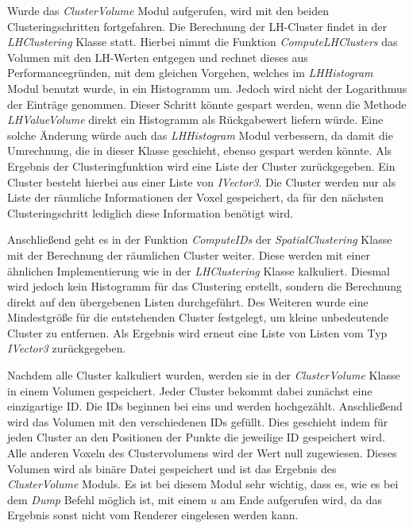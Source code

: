 Wurde das \textit{ClusterVolume} Modul aufgerufen, wird mit den beiden Clusteringschritten fortgefahren. Die Berechnung der LH-Cluster findet in der \textit{LHClustering} Klasse statt. Hierbei nimmt die Funktion \textit{ComputeLHClusters} das Volumen mit den LH-Werten entgegen und rechnet dieses aus Performancegründen, mit dem gleichen Vorgehen, welches im \textit{LHHistogram} Modul benutzt wurde, in ein Histogramm um. Jedoch wird nicht der Logarithmus der Einträge genommen. Dieser Schritt könnte gespart werden, wenn die Methode \textit{LHValueVolume} direkt ein Histogramm als Rückgabewert liefern würde. Eine solche Änderung würde auch das \textit{LHHistogram} Modul verbessern, da damit die Umrechnung, die in dieser Klasse geschieht, ebenso gespart werden könnte.
\newline
Als Ergebnis der Clusteringfunktion wird eine Liste der Cluster zurückgegeben. Ein Cluster besteht hierbei aus einer Liste von \textit{IVector3}. Die Cluster werden nur als Liste der räumliche Informationen der Voxel gespeichert, da für den nächsten Clusteringschritt  lediglich diese Information benötigt wird. 


Anschließend geht es in der Funktion \textit{ComputeIDs} der \textit{SpatialClustering} Klasse mit der Berechnung der räumlichen Cluster weiter. Diese werden mit einer ähnlichen Implementierung wie in der \textit{LHClustering} Klasse kalkuliert. Diesmal wird jedoch kein Histogramm für das Clustering erstellt, sondern die Berechnung direkt auf den übergebenen Listen durchgeführt. Des Weiteren wurde eine Mindestgröße für die entstehenden Cluster festgelegt, um kleine unbedeutende Cluster zu entfernen. Als Ergebnis wird erneut eine Liste von Listen vom Typ \textit{IVector3} zurückgegeben.


Nachdem alle Cluster kalkuliert wurden, werden sie in der \textit{ClusterVolume} Klasse in einem Volumen gespeichert. Jeder Cluster bekommt dabei zunächst eine einzigartige ID. Die IDs beginnen bei eins und werden hochgezählt. Anschließend wird das Volumen mit den verschiedenen IDs gefüllt. Dies geschieht indem für jeden Cluster an den Positionen der Punkte die jeweilige ID gespeichert wird. Alle anderen Voxeln des Clustervolumens wird der Wert null zugewiesen.
Dieses Volumen wird als binäre Datei gespeichert und ist das Ergebnis des \textit{ClusterVolume} Moduls. Es ist bei diesem Modul sehr wichtig, dass es, wie es bei dem \textit{Dump} Befehl möglich ist, mit einem $u$ am Ende aufgerufen wird, da das Ergebnis sonst nicht vom Renderer eingelesen werden kann.


